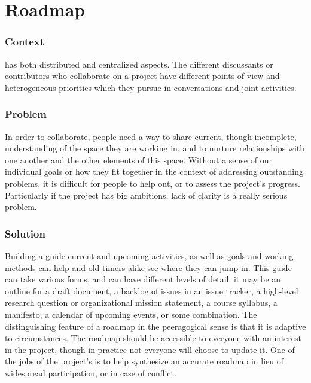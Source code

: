 

\section{Roadmap} \label{sec:Roadmap}



\subsubsection*{Context}  has both distributed and centralized aspects. The different discussants or contributors who collaborate on a project have different points of view and heterogeneous priorities which they pursue in conversations and joint activities.

\subsubsection*{Problem} In order to collaborate, people need a way to share current, though incomplete, understanding of the space they are working in, and to nurture relationships with one another and the other elements of this space.  Without a sense of our individual goals or how they fit together in the context of addressing outstanding problems, it is difficult for people to help out, or to assess the 
project's progress.  Particularly if the project has big ambitions, lack of clarity is a really serious problem.

\subsubsection*{Solution} Building a guide current and upcoming activities, as well as goals and working methods can help  and old-timers alike see where they can jump in.  This guide can take various forms, and can have different levels of detail: it may be an outline for a draft document, a backlog of issues in an issue tracker, a high-level research question or organizational mission statement, a course syllabus, a manifesto, a calendar of upcoming events, or some combination.  The distinguishing feature of a roadmap in the peeragogical sense is that it is adaptive to circumstances.  The roadmap should be accessible to everyone with an interest in the project, though in practice not everyone will choose to update it.  One of the jobs of the project's  is to help synthesize an accurate roadmap in lieu of widespread participation, or in case of conflict.

